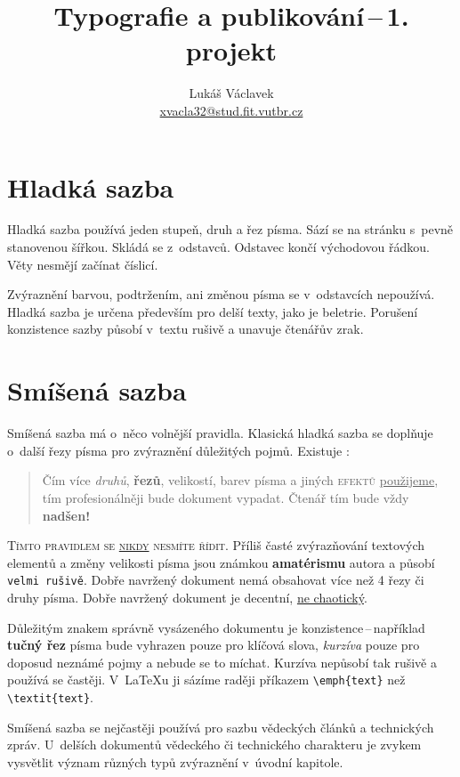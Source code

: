 \documentclass[a4paper, twocolumn, 10pt]{article}
\title{Typografie a publikování\,--\,1. projekt}
\author{Lukáš Václavek \\ \href{mailto:xvacla32@stud.fit.vutbr.cz}{xvacla32@stud.fit.vutbr.cz}}
\date{}
\begin{document}
\maketitle

\section{Hladká sazba}
Hladká sazba používá jeden stupeň, druh a řez písma.
Sází se na stránku s~pevně stanovenou šířkou.
Skládá se z~odstavců. Odstavec končí východovou řádkou.
Věty nesmějí začínat číslicí.

Zvýraznění barvou, podtržením, ani změnou písma se v~odstavcích nepoužívá.
Hladká sazba je určena především pro delší texty, jako je beletrie.
Porušení konzistence sazby působí v~textu rušivě a unavuje čtenářův zrak.

\section{Smíšená sazba}
\label{sec:sazba}
Smíšená sazba má o~něco volnější pravidla.
Klasická hladká sazba se doplňuje o~další řezy písma pro zvýraznění důležitých pojmů.
Existuje :

\begin{quotation}
Čím více \textit{druhů}, \textbf{řezů}, {\huge velikostí}, {\color{blue}barev} písma a jiných {\textsc{\color{red}efektů}} \underline{použijeme}, tím {\color{Orange}profesionálněji} bude {\selectfont \Large{dokument}} vypadat.
{\tiny{Čtenář}} tím bude vždy {\textbf{\Huge{nadšen!}}}
\end{quotation}

{\textsc{Tímto pravidlem se \underline{nikdy} nesmíte řídit}}.
Příliš časté zvýrazňování textových elementů a změny {\tiny{velikosti}} písma jsou známkou \textbf{amatérismu} autora a působí {\texttt{velmi rušivě}}.
Dobře navržený dokument nemá obsahovat více než 4 řezy či druhy písma.
Dobře navržený dokument je decentní, \underline{ne chaotický}.

Důležitým znakem správně vysázeného dokumentu je konzistence\,--\,například {\textbf{tučný řez}} písma bude vyhrazen pouze pro klíčová slova, {\textit{kurzíva}} pouze pro doposud neznámé pojmy a nebude se to míchat.
Kurzíva nepůsobí tak rušivě a používá se častěji.
V~\LaTeX u ji sázíme raději příkazem \verb|\emph{text}| než \verb|\textit{text}|.

Smíšená sazba se nejčastěji používá pro sazbu vědeckých článků a technických zpráv.
U~delších dokumentů vědeckého či technického charakteru je zvykem vysvětlit význam různých typů zvýraznění v~úvodní kapitole.
\end{document}
